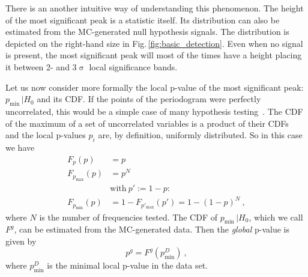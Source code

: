 There is an another intuitive way of understanding this phenomenon. The height of the most significant peak is a statistic itself. Its distribution can also be estimated from the MC-generated null hypothesis signals. The distribution is depicted on the right-hand size in Fig.\,\ref{fig:basic_detection}. Even when no signal is present, the most significant peak will most of the times have a height placing it between 2- and 3$\upsigma$ local significance bands.

Let us now consider more formally the local p-value of the most significant peak: $p_\text{min} \, | H_0$ and its CDF\@. If the points of the periodogram were perfectly uncorrelated, this would be a simple case of many hypothesis testing~\cite{Algeri2016}. The CDF of the maximum of a set of uncorrelated variables is a product of their CDFs~\cite{Papoulis2002} and the local p-values $p_i$ are, by definition, uniformly distributed. So in this case we have
\begin{align}\label{eq:Fpmin}
  F_p(p) &= p \\
  F_{p_\text{max}}(p) &= p^N \\
  &\text{with}\ p' := 1 - p : \nonumber \\
  F_{p_\text{min}}(p) &= 1 - F_{p'_\text{max}}(p') = 1 - {(1 - p)}^N \ , \label{eq:global_CDF_functional_form}
\end{align}
where $N$ is the number of frequencies tested.
The CDF of $p_\text{min} \, | H_0$, which we call $F^g$, can be estimated from the MC-generated data. Then the \emph{global} p-value is given by
\begin{equation}
  p^g = F^g(p_\text{min}^D) \ ,
\end{equation}
where $p_\text{min}^D$ is the minimal local p-value in the data set.

